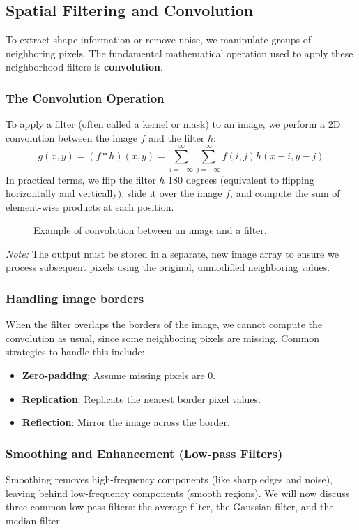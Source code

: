 \subsection{Spatial Filtering and Convolution}
To extract shape information or remove noise, we manipulate groups of neighboring pixels. The fundamental mathematical operation used to apply these neighborhood filters is \textbf{convolution}.

\subsubsection{The Convolution Operation}
To apply a filter (often called a kernel or mask) to an image, we perform a 2D convolution between the image $f$ and the filter $h$:
\begin{equation}
    g(x,y) = (f * h)(x,y) = \sum_{i=-\infty}^{\infty} \sum_{j=-\infty}^{\infty} f(i,j) h(x-i, y-j)
\end{equation}
In practical terms, we flip the filter $h$ 180 degrees (equivalent to flipping horizontally and vertically), slide it over the image $f$, and compute the sum of element-wise products at each position.
\begin{figure}[H]
    \centering
    \scalebox{0.8}{
        
    }
    \caption{Example of convolution between an image and a filter.}
\end{figure} 
\textit{Note:} The output must be stored in a separate, new image array to ensure we process subsequent pixels using the original, unmodified neighboring values.

\subsubsection*{Handling image borders}
When the filter overlaps the borders of the image, we cannot compute the convolution as usual, since some neighboring pixels are missing.
Common strategies to handle this include:
\begin{itemize}
    \item \textbf{Zero-padding}: Assume missing pixels are 0.
    \item \textbf{Replication}: Replicate the nearest border pixel values.
    \item \textbf{Reflection}: Mirror the image across the border.
\end{itemize}

\subsubsection{Smoothing and Enhancement (Low-pass Filters)}
Smoothing removes high-frequency components (like sharp edges and noise), leaving behind low-frequency components (smooth regions).
We will now discuss three common low-pass filters: the average filter, the Gaussian filter, and the median filter.

